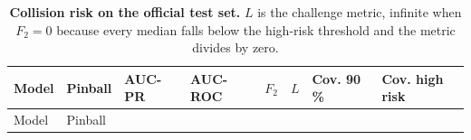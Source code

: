 \documentclass[3p,times]{elsarticle}
\begin{document}
\begin{longtable}[]{@{}
  >{\raggedright\arraybackslash}p{}
  >{\raggedleft\arraybackslash}p{}
  >{\raggedleft\arraybackslash}p{}
  >{\raggedleft\arraybackslash}p{}
  >{\raggedleft\arraybackslash}p{}
  >{\raggedleft\arraybackslash}p{}
  >{\raggedleft\arraybackslash}p{}
  >{\raggedleft\arraybackslash}p{}@{}}
\caption{\textbf{Collision risk on the official test set.} \(L\) is the
challenge metric, infinite when \(F_2 = 0\) because every median falls
below the high-risk threshold and the metric divides by
zero.}\label{tbl:cac}\tabularnewline
\toprule\noalign{}
\begin{minipage}[b]{\linewidth}\raggedright
Model
\end{minipage} & \begin{minipage}[b]{\linewidth}\raggedleft
Pinball
\end{minipage} & \begin{minipage}[b]{\linewidth}\raggedleft
AUC-PR
\end{minipage} & \begin{minipage}[b]{\linewidth}\raggedleft
AUC-ROC
\end{minipage} & \begin{minipage}[b]{\linewidth}\raggedleft
\(F_2\)
\end{minipage} & \begin{minipage}[b]{\linewidth}\raggedleft
\(L\)
\end{minipage} & \begin{minipage}[b]{\linewidth}\raggedleft
Cov. 90 \%
\end{minipage} & \begin{minipage}[b]{\linewidth}\raggedleft
Cov. high risk
\end{minipage} \\
\midrule\noalign{}
\endfirsthead
\toprule\noalign{}
\begin{minipage}[b]{\linewidth}\raggedright
Model
\end{minipage} & \begin{minipage}[b]{\linewidth}\raggedleft
Pinball
\end{minipage} & \begin{minipage}[b]{\linewidth}\raggedleft

\end{minipage}
\end{longtable}
\end{document}
